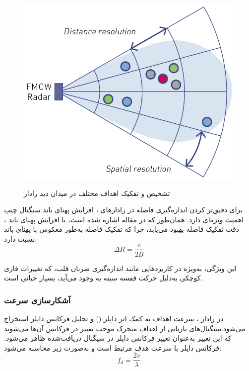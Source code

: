 \vspace{2cm}
\begin{center}
\begin{figure}[!h]
\includegraphics[height=10cm,width=12cm]{Images/chapter2/2-2.jpg}
\caption{تشخیص و تفکیک اهداف مختلف در میدان دید رادار 
\cite{rfbeam2024}
}
\end{figure}
\end{center}
\vspace{2cm}

برای دقیق‌تر کردن اندازه‌گیری فاصله در رادارهای ، افزایش پهنای باند سیگنال چیپ اهمیت ویژه‌ای دارد. همان‌طور که در مقاله \cite{neemat2019reconfigurable} اشاره شده است، با افزایش پهنای باند ، دقت تفکیک فاصله بهبود می‌یابد، چرا که تفکیک فاصله  به‌طور معکوس با پهنای باند نسبت دارد:
\begin{equation}
\Delta R = \frac{c}{2B}
\label{eq:range_resolution}
\end{equation}

این ویژگی، به‌ویژه در کاربردهایی مانند اندازه‌گیری ضربان قلب، که تغییرات فازی کوچکی به‌دلیل حرکت قفسه سینه به وجود می‌آید، بسیار حیاتی است.

\subsubsection{آشکارسازی سرعت} %
\label{sec:velocity-detection}

در رادار ، سرعت اهداف به کمک اثر داپلر () و تحلیل فرکانس داپلر استخراج می‌شود.سیگنال‌های بازتابی از اهداف متحرک موجب تغییر در فرکانس آن‌ها می‌شوند که این تغییر به‌عنوان تغییر فرکانس داپلر در سیگنال دریافت‌شده ظاهر می‌شود. فرکانس داپلر با سرعت هدف مرتبط است \cite{kwak2024adjusting} و به‌صورت زیر محاسبه می‌شود:
\begin{equation}
f_d = \frac{2v}{\lambda}
\label{eq:doppler_frequency}
\end{equation}

